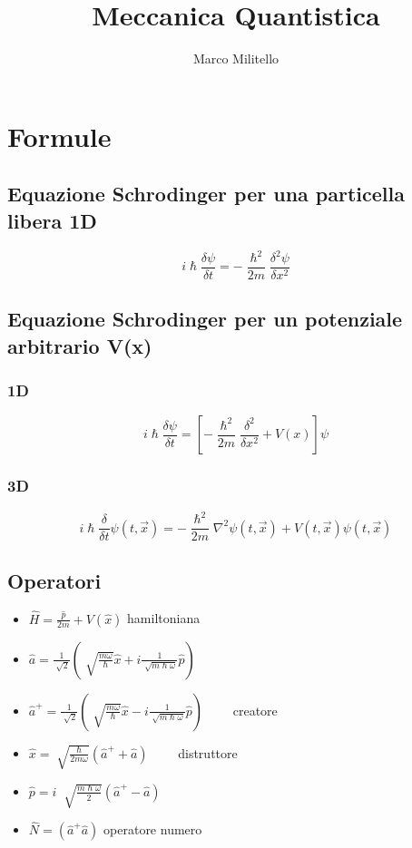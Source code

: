 \documentclass[a4paper,11pt]{report}
\theoremstyle{remark}
\theoremstyle{definition}
\begin{document}
	\date{}
	\author{Marco Militello}
	\title{Meccanica Quantistica}
	\maketitle
	\tableofcontents
	\newpage

\chapter{Formule}

\section{Equazione Schrodinger per una particella libera 1D}
\begin{equation*}
    i\hslash \frac{\delta \psi}{\delta t} = -\frac{\hslash^2}{2m}\frac{\delta^2 \psi}{\delta x^2}
\end{equation*}

\section{Equazione Schrodinger per un potenziale arbitrario V(x)}
\subsection{1D}
\begin{equation*}
    i\hslash \frac{\delta \psi}{\delta t } = \left[-\frac{\hslash^2}{2m}\frac{\delta^2}{\delta x^2} + V(x)\right]\psi
\end{equation*}
\subsection{3D}
\begin{equation*}
    i\hslash \frac{\delta}{\delta t} \psi(t,\vec{x}) = -\frac{\hslash^2}{2m} \nabla^2 \psi(t,\vec{x}) + V(t,\vec{x})\psi(t,\vec{x})
\end{equation*}

\section{Operatori}
\begin{itemize}
    \item $\hat{H} = \frac{\hat{p}}{2m} + V(\hat{x})$ \qquad hamiltoniana
    \item $\hat{a} = \frac{1}{\sqrt[]{2}}\left(\sqrt[]{\frac{m\omega}{\hslash}}\hat{x}+ i \frac{1}{\sqrt[]{m\hslash\omega}}\hat{p}\right)$
    \item $\hat{a}^+ = \frac{1}{\sqrt[]{2}}\left(\sqrt[]{\frac{m\omega}{\hslash}}\hat{x} - i \frac{1}{\sqrt[]{m\hslash\omega}}\hat{p}\right)\qquad$  creatore 
    \item $\hat{x} = \sqrt[]{\frac{\hslash}{2m\omega}}(\hat{a}^+ + \hat{a}) \qquad$ distruttore
    \item $\hat{p} = i \; \sqrt[]{\frac{m\hslash\omega}{2}}(\hat{a}^+ - \hat{a})$ 
    \item $\hat{N} = (\hat{a}^+\hat{a})$ \qquad operatore numero
\end{itemize}
\end{document}

